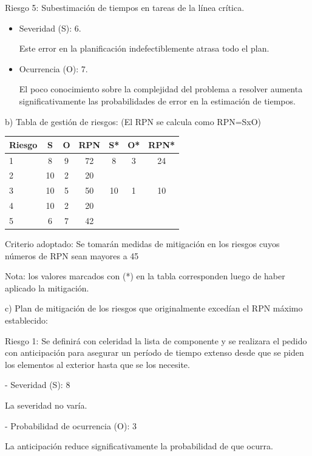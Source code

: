 \documentclass[
11pt, %
codirector, %
]{charter}
\begin{document}
Riesgo 5: Subestimación de tiempos en tareas de la línea crítica.
\begin{itemize}
	\item Severidad (S): 6.

	      Este error en la planificación indefectiblemente atrasa todo el plan.

	\item Ocurrencia (O): 7.

	      El poco conocimiento sobre la complejidad del problema a resolver aumenta significativamente las probabilidades de error en la estimación de tiempos.
\end{itemize}
b) Tabla de gestión de riesgos:      (El RPN se calcula como RPN=SxO)
\begin{table}[htpb]
	\centering
	\begin{tabularx}{\linewidth}{@{}|X|c|c|c|c|c|c|@{}}
		\hline
		\rowcolor[HTML]{C0C0C0}
		Riesgo & S  & O & RPN & S* & O* & RPN* \\ \hline
		1      & 8  & 9 & 72  & 8  & 3  & 24   \\ \hline
		2      & 10 & 2 & 20  &    &    &      \\ \hline
		3      & 10 & 5 & 50  & 10 & 1  & 10   \\ \hline
		4      & 10 & 2 & 20  &    &    &      \\ \hline
		5      & 6  & 7 & 42  &    &    &      \\ \hline
	\end{tabularx}%
\end{table}

Criterio adoptado:
Se tomarán medidas de mitigación en los riesgos cuyos números de RPN sean mayores a 45

Nota: los valores marcados con (*) en la tabla corresponden luego de haber aplicado la mitigación.

c) Plan de mitigación de los riesgos que originalmente excedían el RPN máximo establecido:

Riesgo 1: Se definirá con celeridad la lista de componente y se realizara el pedido con anticipación para asegurar un período de tiempo extenso desde que se piden los elementos al exterior hasta que se los necesite.

- Severidad (S): 8

La severidad no varía.

- Probabilidad de ocurrencia (O): 3

La anticipación reduce significativamente la probabilidad de que ocurra.
\end{document}
